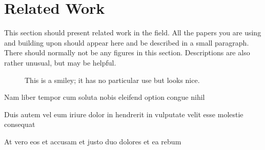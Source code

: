 \section{Related Work}
\label{sec:related_work}

This section should present related work in the field. All the papers
you are using and building upon should appear here and be described in
a small paragraph. There should normally not be any figures in this
section. Descriptions are also rather unusual, but may be helpful.

\begin{figure}[ht]
	\centering
	\caption[This is a smiley]{This is a smiley; it has no
          particular use but looks nice.}
	\label{fig:smiley}
\end{figure}


\begin{description} \label{example:description}
	\item[Lorem:] Nam liber tempor cum soluta nobis eleifend
          option congue nihil  
	\item[Ipsum:] Duis autem vel eum iriure dolor in hendrerit in
          vulputate velit esse molestie consequat 
	\item[Dolor:] At vero eos et accusam et justo duo dolores et ea rebum
\end{description}
